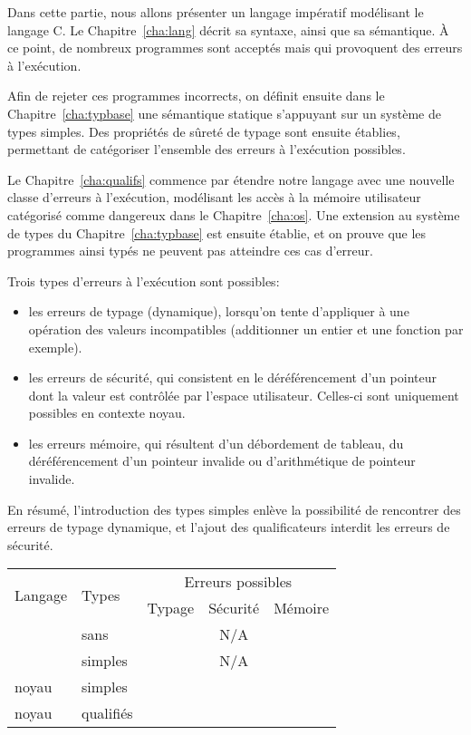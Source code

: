 \begin{headingpage}
Dans cette partie, nous allons présenter un langage impératif modélisant le
langage C. Le Chapitre~\ref{cha:lang} décrit sa syntaxe, ainsi que sa
sémantique. À ce point, de nombreux programmes sont acceptés mais qui provoquent
des erreurs à l'exécution.

Afin de rejeter ces programmes incorrects, on définit ensuite dans le
Chapitre~\ref{cha:typbase} une sémantique statique s'appuyant sur un système de
types simples. Des propriétés de sûreté de typage sont ensuite établies,
permettant de catégoriser l'ensemble des erreurs à l'exécution possibles.

Le Chapitre~\ref{cha:qualifs} commence par étendre notre langage avec une
nouvelle classe d'erreurs à l'exécution, modélisant les accès à la mémoire
utilisateur catégorisé comme dangereux dans le Chapitre~\ref{cha:os}. Une
extension au système de types du Chapitre~\ref{cha:typbase} est ensuite établie,
et on prouve que les programmes ainsi typés ne peuvent pas atteindre ces cas
d'erreur.

Trois types d'erreurs à l'exécution sont possibles:

\begin{itemize}
\item
  les erreurs de typage (dynamique), lorsqu'on tente d'appliquer à une
  opération des valeurs incompatibles (additionner un entier et une
  fonction par exemple).
\item
  les erreurs de sécurité, qui consistent en le déréférencement d'un
  pointeur dont la valeur est contrôlée par l'espace utilisateur.
  Celles-ci sont uniquement possibles en contexte noyau.
\item
  les erreurs mémoire, qui résultent d'un débordement de tableau, du
  déréférencement d'un pointeur invalide ou d'arithmétique de pointeur
  invalide.
\end{itemize}

En résumé, l'introduction des types simples enlève la possibilité de rencontrer
des erreurs de typage dynamique, et l'ajout des qualificateurs interdit les
erreurs de sécurité.

\begin{center}
\begin{tabular}{ll@{\hskip 15mm}ccc}
\toprule
\multirow{2}{*}{Langage} & \multirow{2}{*}{Types}  & \multicolumn{3}{c}{Erreurs possibles}   \\
                         &  & Typage      & Sécurité    & Mémoire     \\
\midrule
\langname{}       & sans      & \CheckedBox{} & N/A           & \CheckedBox{} \\
\langname{}       & simples   & \Square{}     & N/A           & \CheckedBox{} \\
\langname{} noyau & simples   & \Square{}     & \CheckedBox{} & \CheckedBox{} \\
\langname{} noyau & qualifiés & \Square{}     & \Square{}     & \CheckedBox{} \\
\bottomrule
\end{tabular}


\end{center}
\end{headingpage}
